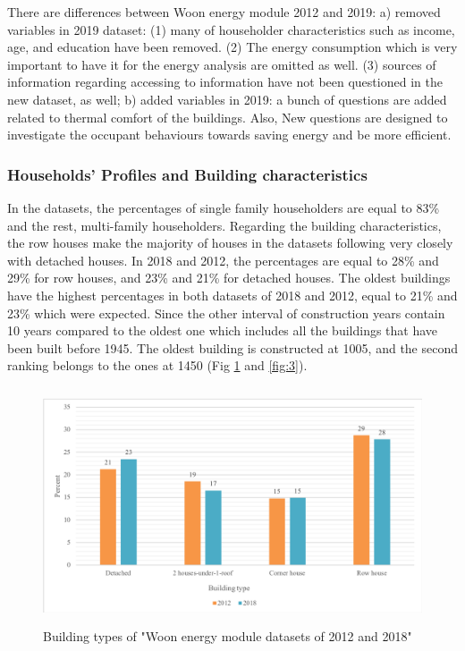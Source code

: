 \documentclass[preprint,12pt,3p]{elsarticle}
\begin{document}
There are differences between Woon energy module 2012 and 2019: a) removed variables in 2019 dataset: (1) many of householder characteristics such as income, age, and education have been removed. (2) The energy consumption which is very important to have it for the energy analysis are omitted as well. (3) sources of information regarding accessing to information have not been questioned in the new dataset, as well; b) added variables in 2019: a bunch of questions are added related to thermal comfort of the buildings. Also, New questions are designed to investigate the occupant behaviours towards saving energy and be more efficient.    

\subsubsection{Households’ Profiles and Building characteristics}

In the datasets, the percentages of single family householders are equal to 83\% and the rest, multi-family householders. Regarding the building characteristics, the row houses make the majority of houses in the datasets following very closely with detached houses. In 2018 and 2012, the percentages are equal to 28\% and 29\% for row houses, and 23\% and 21\% for detached houses. The oldest buildings have the highest percentages in both datasets of 2018 and 2012, equal to 21\% and 23\% which were expected. Since the other interval of construction years contain 10 years compared to the oldest one which includes all the buildings that have been built before 1945. The oldest building is constructed at 1005, and the second ranking belongs to the ones at 1450 (Fig \ref{fig:2} and \ref{fig:3}). 
 
\begin{figure}[H]
    \centering
    \includegraphics[width=14cm, height=7cm, clip, trim=4 4 4 4, clip]{buildingtype.PNG}
    \caption{Building types of "Woon energy module datasets of 2012 and 2018"}
    \label{fig:2}
\end{figure}
\end{document}
